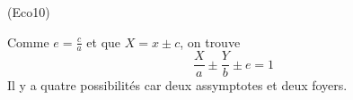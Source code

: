 \begin{tiny}(Eco10)\end{tiny} Comme $e=\frac{c}{a}$ et que $X=x\pm c$, on trouve
\begin{displaymath}
 \frac{X}{a}\pm \frac{Y}{b}\pm e =1
\end{displaymath}
Il y a quatre possibilités car deux assymptotes et deux foyers.